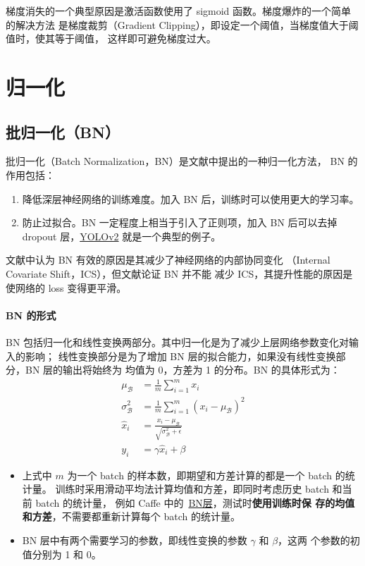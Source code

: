 梯度消失的一个典型原因是激活函数使用了 sigmoid 函数。梯度爆炸的一个简单的解决方法
是梯度裁剪（Gradient Clipping），即设定一个阈值，当梯度值大于阈值时，使其等于阈值，
这样即可避免梯度过大。

\section{归一化}

\subsection{批归一化（BN）}\label{sub:BN}

批归一化（Batch Normalization，BN）是文献中提出的一种归一化方法，
BN 的作用包括：

\begin{enumerate}
  \item 降低深层神经网络的训练难度。加入 BN 后，训练时可以使用更大的学习率。
  \item 防止过拟合。BN 一定程度上相当于引入了正则项，加入 BN 后可以去掉 dropout
    层，\hyperref[subsec:YOLOv2]{YOLOv2} 就是一个典型的例子。
\end{enumerate}

文献中认为 BN 有效的原因是其减少了神经网络的内部协同变化
（Internal Covariate Shift，ICS），但文献论证 BN 并不能
减少 ICS，其提升性能的原因是使网络的 loss 变得更平滑。

\paragraph{BN 的形式}
BN 包括归一化和线性变换两部分。其中归一化是为了减少上层网络参数变化对输入的影响；
线性变换部分是为了增加 BN 层的拟合能力，如果没有线性变换部分，BN 层的输出将始终为
均值为 0，方差为 1 的分布。BN 的具体形式为：
\begin{align}
  \label{equ:BN}
  \mu_{\mathcal{B}} & = \frac{1}{m} \sum_{i=1}^{m} x_i \\
  \sigma_{\mathcal{B}}^2 & = \frac{1}{m} \sum_{i=1}^{m} {(x_i-\mu_{\mathcal{B}})}^2 \\
  \hat{x}_i & = \frac{x_i - \mu_{\mathcal{B}}}{\sqrt{\sigma_{\mathcal{B}}^2 + \epsilon}} \\
  y_i & = \gamma \hat{x}_i + \beta
\end{align}

\begin{itemize}
\item 上式中 $m$ 为一个 batch 的样本数，即期望和方差计算的都是一个 batch 的统计量。
  训练时采用滑动平均法计算均值和方差，即同时考虑历史 batch 和当前 batch 的统计量，
  例如 Caffe 中的~\href{https://bit.ly/2JBY7aw}{BN层}，测试时\textbf{使用训练时保
    存的均值和方差}，不需要都重新计算每个 batch 的统计量。
  \item BN 层中有两个需要学习的参数，即线性变换的参数 $\gamma$ 和 $\beta$，这两
    个参数的初值分别为 1 和 0。
\end{itemize}

